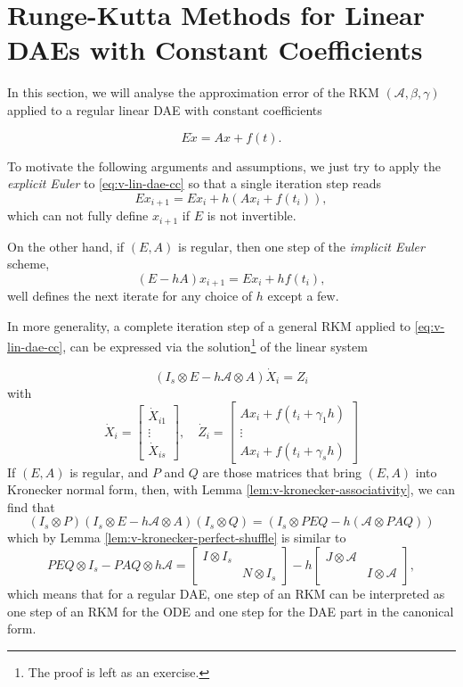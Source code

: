 \documentclass[]{book}
\theoremstyle{definition}
\theoremstyle{definition}
\theoremstyle{definition}
\theoremstyle{definition}
\theoremstyle{remark}
\begin{document}
\hypertarget{runge-kutta-methods-for-linear-daes-with-constant-coefficients}{%
\section{Runge-Kutta Methods for Linear DAEs with Constant Coefficients}\label{runge-kutta-methods-for-linear-daes-with-constant-coefficients}}

In this section, we will analyse the approximation error of the RKM \((\mathcal A, \beta, \gamma)\) applied to a regular linear DAE with constant coefficients

\[
 E\dot x = Ax+f(t). \label{eq:v-lin-dae-cc}
\]

To motivate the following arguments and assumptions, we just try to apply the \emph{explicit Euler} to \eqref{eq:v-lin-dae-cc} so that a single iteration step reads
\[
Ex_{i+1} = Ex_i + h(Ax_i + f(t_i)),
\]
which can not fully define \(x_{i+1}\) if \(E\) is not invertible.

On the other hand, if \((E,A)\) is regular, then one step of the \emph{implicit Euler} scheme,
\[
(E-hA)x_{i+1} = Ex_i + hf(t_i),
\]
well defines the next iterate for any choice of \(h\) except a few.

In more generality, a complete iteration step of a general RKM applied to \eqref{eq:v-lin-dae-cc}, can be expressed via the solution\footnote{The proof is left as an exercise.} of the linear system

\[
(I_s \otimes E - h\mathcal A \otimes A) \dot X_i = Z_i
\]
with
\[
\dot X_i = 
\begin{bmatrix}
\dot X_{i1} \\ \vdots \\ \dot X_{is}
\end{bmatrix}, \quad
\dot Z_i = 
\begin{bmatrix}
Ax_{i}+f(t_i+\gamma_1h) \\ \vdots \\ Ax_{i}+f(t_i+\gamma_sh)
\end{bmatrix}
\]
If \((E, A)\) is regular, and \(P\) and \(Q\) are those matrices that bring \((E,A)\) into Kronecker normal form, then, with Lemma \ref{lem:v-kronecker-associativity}, we can find that
\[
(I_s\otimes P)(I_s \otimes E - h\mathcal A \otimes A)(I_s \otimes Q) = (I_s \otimes PEQ - h(\mathcal A \otimes PAQ))
\]
which by Lemma \ref{lem:v-kronecker-perfect-shuffle} is similar to
\[
PEQ\otimes I_s - PAQ \otimes h\mathcal A = 
\begin{bmatrix}
I \otimes I_s & \\ & N\otimes I_s
\end{bmatrix}
- h
\begin{bmatrix}
J \otimes \mathcal A & \\ & I\otimes \mathcal A 
\end{bmatrix},
\]
which means that for a regular DAE, one step of an RKM can be interpreted as one step of an RKM for the ODE and one step for the DAE part in the canonical form.
\end{document}
